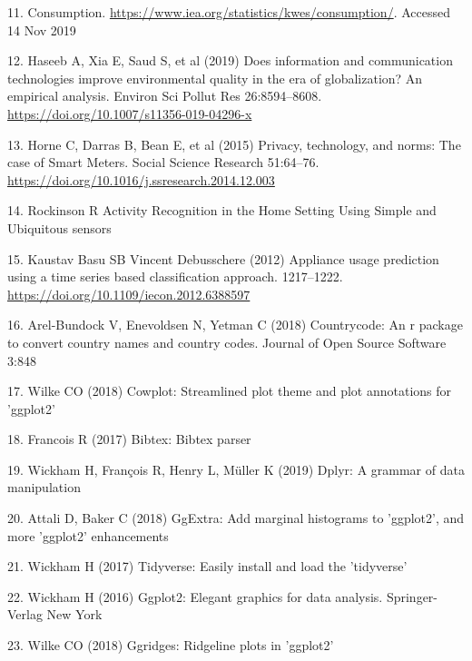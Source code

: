 \documentclass[11pt,]{article}
\begin{document}
\leavevmode\hypertarget{ref-Consumption}{}%
11. Consumption. \url{https://www.iea.org/statistics/kwes/consumption/}.
Accessed 14 Nov 2019

\leavevmode\hypertarget{ref-haseebDoesInformationCommunication2019}{}%
12. Haseeb A, Xia E, Saud S, et al (2019) Does information and
communication technologies improve environmental quality in the era of
globalization? An empirical analysis. Environ Sci Pollut Res
26:8594--8608. \url{https://doi.org/10.1007/s11356-019-04296-x}

\leavevmode\hypertarget{ref-hornePrivacyTechnologyNorms2015}{}%
13. Horne C, Darras B, Bean E, et al (2015) Privacy, technology, and
norms: The case of Smart Meters. Social Science Research 51:64--76.
\url{https://doi.org/10.1016/j.ssresearch.2014.12.003}

\leavevmode\hypertarget{ref-rockinsonActivityRecognitionHome}{}%
14. Rockinson R Activity Recognition in the Home Setting Using Simple
and Ubiquitous sensors

\leavevmode\hypertarget{ref-kaustavbasuApplianceUsagePrediction2012}{}%
15. Kaustav Basu SB Vincent Debusschere (2012) Appliance usage
prediction using a time series based classification approach.
1217--1222. \url{https://doi.org/10.1109/iecon.2012.6388597}

\leavevmode\hypertarget{ref-countrycode}{}%
16. Arel-Bundock V, Enevoldsen N, Yetman C (2018) Countrycode: An r
package to convert country names and country codes. Journal of Open
Source Software 3:848

\leavevmode\hypertarget{ref-cowplot}{}%
17. Wilke CO (2018) Cowplot: Streamlined plot theme and plot annotations
for 'ggplot2'

\leavevmode\hypertarget{ref-bibtex}{}%
18. Francois R (2017) Bibtex: Bibtex parser

\leavevmode\hypertarget{ref-dplyr}{}%
19. Wickham H, François R, Henry L, Müller K (2019) Dplyr: A grammar of
data manipulation

\leavevmode\hypertarget{ref-ggExtra}{}%
20. Attali D, Baker C (2018) GgExtra: Add marginal histograms to
'ggplot2', and more 'ggplot2' enhancements

\leavevmode\hypertarget{ref-tidyverse}{}%
21. Wickham H (2017) Tidyverse: Easily install and load the 'tidyverse'

\leavevmode\hypertarget{ref-ggplot2}{}%
22. Wickham H (2016) Ggplot2: Elegant graphics for data analysis.
Springer-Verlag New York

\leavevmode\hypertarget{ref-ggridges}{}%
23. Wilke CO (2018) Ggridges: Ridgeline plots in 'ggplot2'
\end{document}
